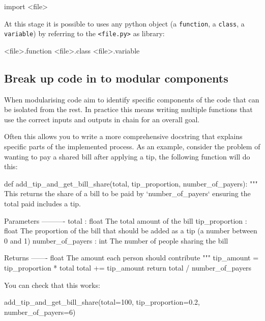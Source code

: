 \begin{api}
import <file>
\end{api}



At this stage it is possible to uses any python object (a \texttt{function}, a
\texttt{class}, a
\texttt{variable}) by referring to the \texttt{<file.py>} as library:

\begin{api}
<file>.function
<file>.class
<file>.variable
\end{api}


\subsection{Break up code in to modular components}
\label{\detokenize{building-tools/05-modularisation/how/main:how-to-break-up-code-in-to-modular-components}}

When modularising code aim to identify specific components of the code that can
be isolated from the rest.
In practice this means writing multiple functions that use the correct inputs
and outputs in chain for an overall goal.


Often this allows you to write a more comprehensive docstring that explains
specific parts of the implemented process.
As an example, consider the problem of wanting to pay a shared bill after
applying a tip, the following function will do this:




\begin{pyin}
def add_tip_and_get_bill_share(total, tip_proportion, number_of_payers):
    """
    This returns the share of a bill to be paid by `number_of_payers`
    ensuring the total paid includes a tip.

    Parameters
    ----------
    total : float
        The total amount of the bill
    tip_proportion : float
        The proportion of the bill that should be added as a tip (a number
        between 0 and 1)
    number_of_payers : int
        The number of people sharing the bill

    Returns
    -------
    float
        The amount each person should contribute
    """
    tip_amount = tip_proportion * total
    total += tip_amount
    return total / number_of_payers
\end{pyin}

You can check that this works:

\begin{pyin}
add_tip_and_get_bill_share(total=100, tip_proportion=0.2, number_of_payers=6)
\end{pyin}





